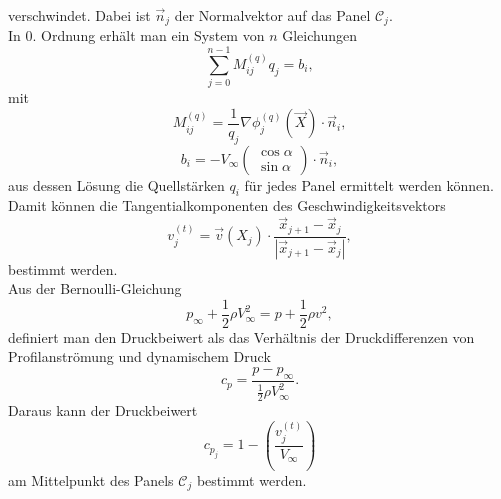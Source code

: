 verschwindet. Dabei ist $\vec n_j$ der Normalvektor auf das Panel $\mathcal{C}_j$.\\
In 0. Ordnung erhält man ein System von $n$ Gleichungen
\begin{equation}
\label{eq:lgls1}
\sum_{j=0}^{n-1} M_{ij}^{(q)}q_j =  b_i,
\end{equation}
mit
\begin{equation}
M_{ij}^{(q)} = \frac{1}{q_j} \nabla \phi_j^{(q)} (\vec X) \cdot \vec n_i,
\end{equation}
\begin{equation}
b_i =  -V_{\infty} \left( \begin{matrix} \cos \alpha \\ \sin \alpha \end{matrix} \right) \cdot \vec n_i,
\end{equation}
aus dessen Lösung die Quellstärken $q_i$ für jedes Panel ermittelt werden können. \\
Damit können die Tangentialkomponenten des Geschwindigkeitsvektors
\begin{equation}
\label{eqn:vt}
v_j^{(t)} =  \vec v(X_j) \cdot \frac{\vec x_{j+1}-\vec x_j}{|\vec x_{j+1}-\vec x_j|},
\end{equation}
bestimmt werden. \\
Aus der Bernoulli-Gleichung
\begin{equation}
p_{\infty} + \frac{1}{2} \rho V_{\infty}^2 =  p + \frac{1}{2} \rho v^2,
\end{equation}
definiert man den Druckbeiwert als das Verhältnis der Druckdifferenzen von Profilanströmung und dynamischem Druck 
\begin{equation}
c_p =  \frac{p-p_{\infty}}{\frac{1}{2} \rho V_{\infty}^2}.
\end{equation}
Daraus kann der Druckbeiwert
\begin{equation}
c_{p_j} =  1 - \left( \frac{v_j^{(t)}}{V_{\infty}}\right)
\end{equation}
am Mittelpunkt des Panels $\mathcal{C}_j$ bestimmt werden. \cite{Hess:1966} \cite{Cebeci:1999} 
